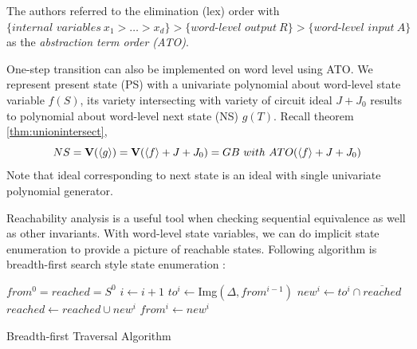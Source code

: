 The authors referred to the elimination (lex) order with
$\{\textit{internal variables} \ x_1 > \dots > x_d\} > \{\textit{word-level
  output} \ R\} > \{\textit{word-level input} \ A\}$ as the {\it abstraction
  term order (ATO)}. 
  
One-step transition can also be implemented on word level using ATO. We represent present state (PS) 
with a univariate polynomial about word-level state variable $f(S)$, its variety intersecting with variety of
circuit ideal $J+J_0$ results to polynomial about word-level next state (NS) $g(T)$. Recall theorem \ref{thm:unionintersect},
$$NS = {\bf V}(\langle g\rangle) = {\bf V}(\langle f\rangle + J+J_0) = GB\ with\ ATO(\langle f\rangle + J+J_0)$$
Note that ideal corresponding to next state is an ideal with single univariate polynomial generator.

Reachability analysis is a useful tool when checking sequential equivalence as well as other invariants.
With word-level state variables, we can do implicit state enumeration to provide a picture of 
reachable states. Following algorithm is breadth-first search style state enumeration \cite{KallaPartialScan}:
\begin{algorithm}[hbt]
\SetAlgoNoLine

  $from^0 = reached = S^0$\;
  {
  	$i \gets i + 1$\;
	$to^i \gets$Img$(\Delta, from^{i-1})$\;
	$new^i \gets to^i \cap \overline{reached}$\;
  	$reached \gets reached \cup new^i$\;
	$from^i \gets new^i$\;
  }
\caption {Breadth-first Traversal Algorithm}\label{alg:BFS}
\end{algorithm}
\begin{figure}[hbt]
\end{figure}

